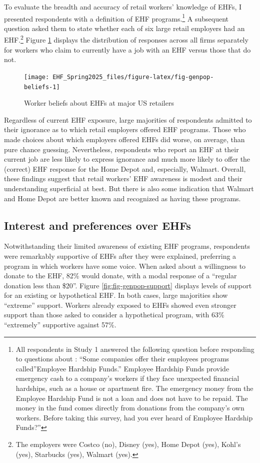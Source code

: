 \documentclass[
  11pt,
  oneside]{article}
\begin{document}
To evaluate the breadth and accuracy of retail workers' knowledge of EHFs, I presented respondents with a definition of EHF programs.\footnote{All respondents in Study 1 answered the following question before responding to questions about : ``Some companies offer their employees programs called''Employee Hardship Funds.'' Employee Hardship Funds provide emergency cash to a company's workers if they face unexpected financial hardships, such as a house or apartment fire. The emergency money from the Employee Hardship Fund is not a loan and does not have to be repaid. The money in the fund comes directly from donations from the company's own workers. Before taking this survey, had you ever heard of Employee Hardship Funds?''} A subsequent question asked them to state whether each of six large retail employers had an EHF.\footnote{The employers were Costco (no), Disney (yes), Home Depot (yes), Kohl's (yes), Starbucks (yes), Walmart (yes).} Figure \ref{fig:fig-genpop-beliefs} displays the distribution of responses across all firms separately for workers who claim to currently have a job with an EHF versus those that do not.

\begin{figure}
\texttt{[image: EHF\_Spring2025\_files/figure-latex/fig-genpop-beliefs-1]} \caption{Worker beliefs about EHFs at major US retailers}\label{fig:fig-genpop-beliefs}
\end{figure}

Regardless of current EHF exposure, large majorities of respondents admitted to their ignorance as to which retail employers offered EHF programs. Those who made choices about which employers offered EHFs did worse, on average, than pure chance guessing. Nevertheless, respondents who report an EHF at their current job are less likely to express ignorance and much more likely to offer the (correct) EHF response for the Home Depot and, especially, Walmart. Overall, these findings suggest that retail workers' EHF awareness is modest and their understanding superficial at best. But there is also some indication that Walmart and Home Depot are better known and recognized as having these programs.

\subsection{Interest and preferences over EHFs}\label{interest-and-preferences-over-ehfs}

Notwithstanding their limited awareness of existing EHF programs, respondents were remarkably supportive of EHFs after they were explained, preferring a program in which workers have some voice. When asked about a willingness to donate to the EHF, 82\% would donate, with a modal response of a ``regular donation less than \$20''. Figure \ref{fig:fig-genpop-support} displays levels of support for an existing or hypothetical EHF. In both cases, large majorities show ``extreme'' support. Workers already exposed to EHFs showed even stronger support than those asked to consider a hypothetical program, with 63\% ``extremely'' supportive against 57\%.
\end{document}
